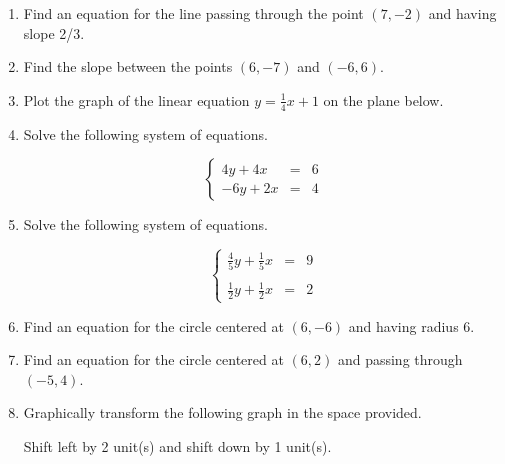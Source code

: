 \documentclass{article}
\begin{document}
\ReviewTitle[class={College Algebra}, for={Test 2}]

\begin{enumerate}
\item Find an equation for the line passing through the point $(7, -2)$ and having slope 2/3. \vspace{5cm}

\item Find the slope between the points $(6, -7)$ and $(-6, 6)$. \vspace{5cm}

\item Plot the graph of the linear equation $y = \frac{1}{4} x + 1$ on the plane below.\begin{center}
\CartesianPlane[h=7,w=7,axes=yes]
\end{center}

  

\newpage

\item Solve the following system of equations.

\[ \left\{ \begin{array}{rcl} 4y + 4x & = & 6 \\ -6y + 2x & = & 4 \end{array} \right. \] \vspace{5cm}

\item Solve the following system of equations.

\[ \left\{ \begin{array}{rcl} \frac{4}{5}y + \frac{1}{5}x & = & 9 \\ & & \\ \frac{1}{2}y + \frac{1}{2}x & = & 2 \end{array} \right. \] \vspace{5cm}

\item Find an equation for the circle centered at $(6, -6)$ and having radius $6$. \vspace{2cm}

\item Find an equation for the circle centered at $(6, 2)$ and passing through $(-5, 4)$. \vspace{5cm}

\newpage

\item Graphically transform the following graph in the space provided.

\begin{center}
Shift left by 2 unit(s) and shift down by 1 unit(s).
\end{center}


\end{enumerate}
\end{document}
